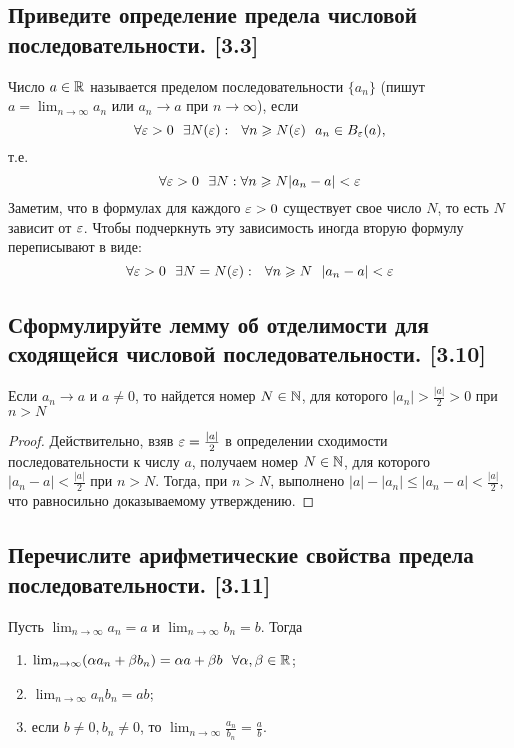 \documentclass[12pt, a4paper]{article}
\begin{document}
    \subsection{Приведите определение предела числовой последовательности. [3.3]}
    Число $a \in \mathbb{R}$ называется пределом последовательности $\{a_n\}$ (пишут $a =  \lim_{n \to \infty} a_n$ или $a_n \to a$ при $n \to \infty$), если
    \begin{equation*}
        \forall \varepsilon > 0 \ \ \exists N(\varepsilon) : \ \ \forall n \geqslant N(\varepsilon) \ \ a_n \in B_{\varepsilon}(a), 
    \end{equation*}
    т.е.
    \begin{equation*}
        \forall \varepsilon > 0 \ \ \exists N: \forall n \geqslant N |a_n - a| < \varepsilon
    \end{equation*}
    Заметим, что в формулах для каждого $\varepsilon > 0$ существует свое число $N$, то есть $N$ зависит от $\varepsilon$. Чтобы подчеркнуть эту зависимость иногда вторую формулу переписывают в виде: 
    \begin{equation*}
        \forall \eps > 0 \ \ \exists N = N(\eps): \ \ \forall n \geq N \ \ |a_n - a| < \eps
    \end{equation*}
    \subsection{Сформулируйте лемму об отделимости для сходящейся числовой последовательности. [3.10]}
    Если $a_n \to a$ и $a \ne 0$, то найдется номер $N \in \mathbb{N}$, для которого $|a_n| > \frac{|a|}{2} > 0$ при $n > N$

    \begin{proof} Действительно, взяв $\varepsilon = \frac{|a|}{2}$ в определении сходимости последовательности к числу $a$, получаем номер $N \in \mathbb{N}$, для которого $|a_n - a| < \frac{|a|}{2}$ при $n > N$. Тогда, при $n > N$, выполнено $|a| - |a_n| \leq |a_n - a| < \frac{|a|}{2}$, что равносильно доказываемому утверждению. \end{proof}
    \subsection{Перечислите арифметические свойства предела последовательности. [3.11]}
    Пусть $ \lim_{n \to \infty} a_n = a$ и $ \lim_{n \to \infty} b_n = b$. Тогда
    \begin{enumerate}
        \item $ \lim_{n \to \infty} (\alpha a_n + \beta b_n) = \alpha a + \beta b \ \ \forall \alpha, \beta \in \mathbb{R}$;
        \item $ \lim_{n \to \infty} a_n b_n = ab$;
        \item если $b \ne 0, b_n \ne 0$, то $ \lim_{n \to \infty} \frac{a_n}{b_n} = \frac{a}{b}$.
    \end{enumerate}
\end{document}
